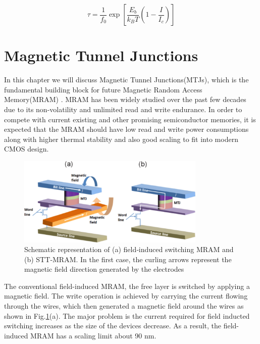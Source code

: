 \begin{equation}
\tau = \frac{1}{f_0}\exp [\frac{E_b}{k_B T}(1 - \frac{I}{I_c})]
\end{equation}


\section{Magnetic Tunnel Junctions}

In this chapter we will discuss Magnetic Tunnel Junctions(MTJs), which is the fundamental building block for future Magnetic Random Access Memory(MRAM)\cite{MTJZhu} . MRAM has been widely studied over the past few decades due to its non-volatility and unlimited read and write endurance\cite{MRAMdevelop}. In order to compete with current existing and other promising semiconductor memories, it is expected that the MRAM should have low read and write power consumptions along with higher thermal stability and also good scaling to fit into modern CMOS design. 

\begin{figure}[h!]
\centering
\includegraphics[width=0.8\textwidth]{fig/MTJ/setup.png}
\caption{Schematic representation of (a) field‐induced switching MRAM and (b) STT‐MRAM. In the first case, the curling arrows represent the magnetic field direction generated by the electrodes}
\label{fig:fieldMTJ}
\end{figure}


The conventional field-induced MRAM, the free layer is switched by applying a magnetic field\cite{MRAMDevelopment1}. The write operation is achieved by carrying the current flowing through the wires, which then generated a magnetic field around the wires as shown in Fig.\ref{fig:fieldMTJ}(a). The major problem is the current required for field inducted switching increases as the size of the devices decrease. As a result, the field-induced MRAM has a scaling limit about 90 nm.


